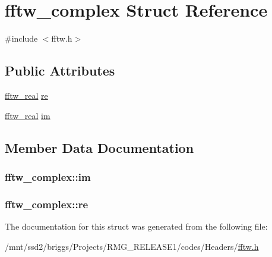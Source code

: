 \hypertarget{structfftw__complex}{\section{fftw\-\_\-complex Struct Reference}
\label{structfftw__complex}
}


{\ttfamily \#include $<$fftw.\-h$>$}

\subsection*{Public Attributes}
\begin{DoxyCompactItemize}
\item 
\hyperlink{fftw_8h_a8a2fb05c0a5d5f1c295ef2e7268c7476}{fftw\-\_\-real} \hyperlink{structfftw__complex_ad34b12338fe65eb4087afb335c9a5ffc}{re}
\item 
\hyperlink{fftw_8h_a8a2fb05c0a5d5f1c295ef2e7268c7476}{fftw\-\_\-real} \hyperlink{structfftw__complex_a4b029960928065e38bc1087d7575503c}{im}
\end{DoxyCompactItemize}


\subsection{Member Data Documentation}
\hypertarget{structfftw__complex_a4b029960928065e38bc1087d7575503c}{
\subsubsection[{im}]{ fftw\-\_\-complex\-::im}}\label{structfftw__complex_a4b029960928065e38bc1087d7575503c}
\hypertarget{structfftw__complex_ad34b12338fe65eb4087afb335c9a5ffc}{
\subsubsection[{re}]{ fftw\-\_\-complex\-::re}}\label{structfftw__complex_ad34b12338fe65eb4087afb335c9a5ffc}


The documentation for this struct was generated from the following file\-:\begin{DoxyCompactItemize}
\item 
/mnt/ssd2/briggs/\-Projects/\-R\-M\-G\-\_\-\-R\-E\-L\-E\-A\-S\-E1/codes/\-Headers/\hyperlink{fftw_8h}{fftw.\-h}\end{DoxyCompactItemize}
